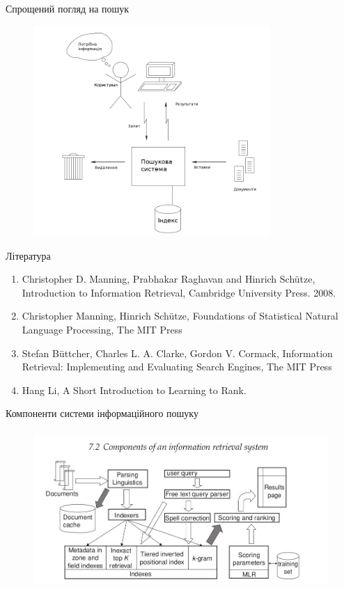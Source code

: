\documentclass[10pt]{beamer}
\begin{document}
\begin{frame}{Спрощений погляд на пошук}
        \begin{center}
            \begin{figure}
            \includegraphics[height=8cm]{images/ir_components_0.png}
            \end{figure}
        \end{center}
\end{frame}

\begin{frame}{Література}
\begin{enumerate}
    \item Christopher D. Manning, Prabhakar Raghavan and Hinrich Schütze, Introduction to Information Retrieval, Cambridge University Press. 2008. 
    \item Christopher Manning, Hinrich Schütze, Foundations of Statistical Natural Language Processing, The MIT Press
    \item  Stefan Büttcher, Charles L. A. Clarke, Gordon V. Cormack, Information Retrieval: Implementing and Evaluating Search Engines, The MIT Press
    \item Hang Li, A Short Introduction to Learning to Rank.
\end{enumerate}
\end{frame}

\begin{frame}{Компоненти системи інформаційного пошуку}
        \begin{center}
            \begin{figure}
            \includegraphics[height=6cm]{images/ir_big_picture.jpg}
            \end{figure}
        \end{center}
\end{frame}
\end{document}
